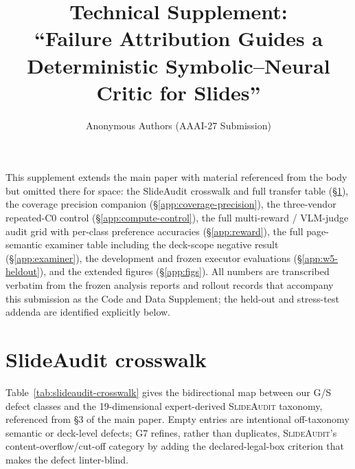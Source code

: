 \documentclass[11pt]{article}
\title{\bf Technical Supplement:\\
``Failure Attribution Guides a Deterministic
Symbolic--Neural Critic for Slides''}
\author{Anonymous Authors (AAAI-27 Submission)}
\date{}
\newcommand{\g}[1]{\textsf{#1}}
\begin{document}
\maketitle

This supplement extends the main paper with material referenced from the body
but omitted there for space: the SlideAudit crosswalk and full transfer table
(\S\ref{app:crosswalk}), the coverage precision companion
(\S\ref{app:coverage-precision}), the three-vendor repeated-C0 control
(\S\ref{app:compute-control}),
the full multi-reward / VLM-judge audit grid with per-class preference accuracies
(\S\ref{app:reward}), the full page-semantic examiner table including the
deck-scope negative result (\S\ref{app:examiner}), the development and frozen
executor evaluations (\S\ref{app:w5-heldout}), and the extended figures
(\S\ref{app:figs}). All numbers are transcribed verbatim from the frozen
analysis reports and rollout records that accompany this submission as the Code
and Data Supplement; the held-out and stress-test addenda are identified
explicitly below.

\section{SlideAudit crosswalk}\label{app:crosswalk}

Table~\ref{tab:slideaudit-crosswalk} gives the bidirectional map between our
G/S defect classes and the 19-dimensional expert-derived \textsc{SlideAudit}
taxonomy, referenced from \S3 of the main paper. Empty entries are intentional
off-taxonomy semantic or deck-level defects; \g{G7} refines, rather than
duplicates, \textsc{SlideAudit}'s content-overflow/cut-off category by adding
the declared-legal-box criterion that makes the defect linter-blind.
\end{document}
